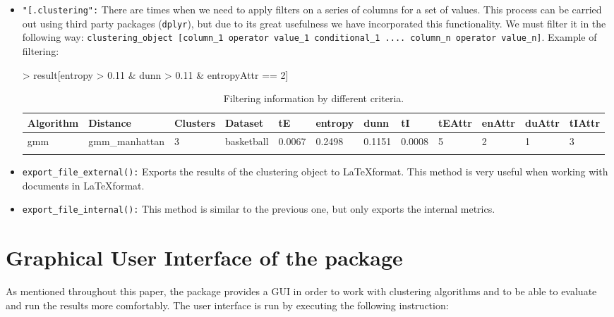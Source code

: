 \begin{itemize}
  \item \texttt{"[.clustering":} There are times when we need to apply filters on a series of columns for a set of values. This process can be carried out using third party packages (\texttt{dplyr}), but due to its great usefulness we have incorporated this functionality. We must filter it in the following way: \texttt{clustering\_object [column\_1 operator value\_1 conditional\_1 .... column\_n operator value\_n]}. Example of filtering:
  \begin{Schunk}
\begin{Sinput}
> result[entropy > 0.11 & dunn > 0.11 & entropyAttr == 2]
\end{Sinput}
\end{Schunk}
{\small
\begin{longtable}{| p{1cm} | p{1.8cm} | p{0.7cm} | p{0.9cm} | p{0.5cm} | p{0.65cm} | p{0.5cm} | p{0.5cm} | p{0.55cm} | p{0.55cm} | p{0.6cm} | p{0.5cm} |}
\hline
\scriptsize  Algorithm & \scriptsize  Distance  &  \scriptsize Clusters & \scriptsize  Dataset & \scriptsize tE & \scriptsize entropy & \scriptsize  dunn  & \scriptsize tI & \scriptsize tEAttr & \scriptsize enAttr & \scriptsize duAttr & \scriptsize tIAttr  \\
\hline
\scriptsize    gmm     & \scriptsize  gmm\_manhattan & \scriptsize      3  & \scriptsize   basketball  & \scriptsize   0.0067  & \scriptsize  0.2498  & \scriptsize 0.1151  & \scriptsize    0.0008     & \scriptsize     5       & \scriptsize       2    & \scriptsize      1      & \scriptsize      3 \\
\hline
\caption{Filtering information by different criteria.}
\label{tab:filtering}
\end{longtable}}

  \item \texttt{export\_file\_external():} Exports the results of the clustering object to \LaTeX format. This method is very useful when working with documents in \LaTeX format.
  \item \texttt{export\_file\_internal():} This method is similar to the previous one, but only exports the internal metrics.
\end{itemize}


\section{Graphical User Interface of the  package}

As mentioned throughout this paper, the  package provides a GUI in order to work with clustering algorithms and to be able to evaluate and run the results more comfortably. The user interface is run by executing the following instruction:

